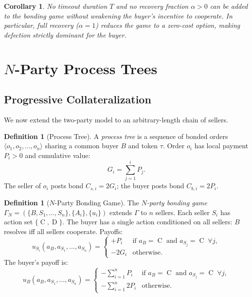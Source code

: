 \documentclass[11pt,a4paper]{article}
\newtheorem{corollary}[theorem]{Corollary}
\theoremstyle{definition}
\newtheorem{definition}[theorem]{Definition}
\theoremstyle{remark}
\newcommand{\pay}{P}           %
\newcommand{\cumval}{G}        %
\newcommand{\ub}{u_B}          %
\DeclareMathOperator{\Coop}{C}
\DeclareMathOperator{\Def}{D}
\begin{document}
\begin{corollary}\label{cor:no-timeout}
No timeout duration $T$ and no recovery fraction $\alpha > 0$ can be
added to the bonding game without weakening the buyer's incentive to
cooperate. In particular, full recovery ($\alpha = 1$) reduces the
game to a zero-cost option, making defection strictly dominant for
the buyer.
\end{corollary}

\section{$N$-Party Process Trees}
\label{sec:process-trees}

\subsection{Progressive Collateralization}

We now extend the two-party model to an arbitrary-length chain of
sellers.

\begin{definition}[Process Tree]
\label{def:process-tree}
A \emph{process tree} is a sequence of bonded orders
$\langle o_1, o_2, \ldots, o_n \rangle$ sharing a common buyer $B$ and
token $\tau$. Order $o_i$ has local payment $\pay_i > 0$ and cumulative
value:
\begin{equation}
  \cumval_i = \sum_{j=1}^{i} \pay_j.
  \label{eq:cumulative}
\end{equation}
The seller of $o_i$ posts bond $C_{s,i} = 2\cumval_i$; the buyer
posts bond $C_{b,i} = 2\pay_i$.
\end{definition}

\begin{definition}[$N$-Party Bonding Game]
\label{def:n-party-game}
The \emph{$N$-party bonding game}
$\Gamma_N = (\{B, S_1, \ldots, S_n\}, \{A_i\}, \{u_i\})$
extends $\Gamma$ to $n$ sellers. Each seller $S_i$ has action set
$\{\Coop, \Def\}$. The buyer has a single action conditioned on all
sellers: $B$ resolves iff all sellers cooperate. Payoffs:
\begin{equation}\label{eq:n-party-seller-utility}
  u_{S_i}(a_B, a_{S_1}, \ldots, a_{S_n}) =
  \begin{cases}
    +\pay_i & \text{if } a_B = \Coop \text{ and } a_{S_j} = \Coop
      \;\forall j, \\
    -2\cumval_i & \text{otherwise}.
  \end{cases}
\end{equation}
The buyer's payoff is:
\begin{equation}\label{eq:n-party-buyer-utility}
  \ub(a_B, a_{S_1}, \ldots, a_{S_n}) =
  \begin{cases}
    -\sum_{i=1}^{n} \pay_i & \text{if } a_B = \Coop \text{ and }
      a_{S_j} = \Coop \;\forall j, \\
    -\sum_{i=1}^{n} 2\pay_i & \text{otherwise}.
  \end{cases}
\end{equation}
\end{definition}
\end{document}
